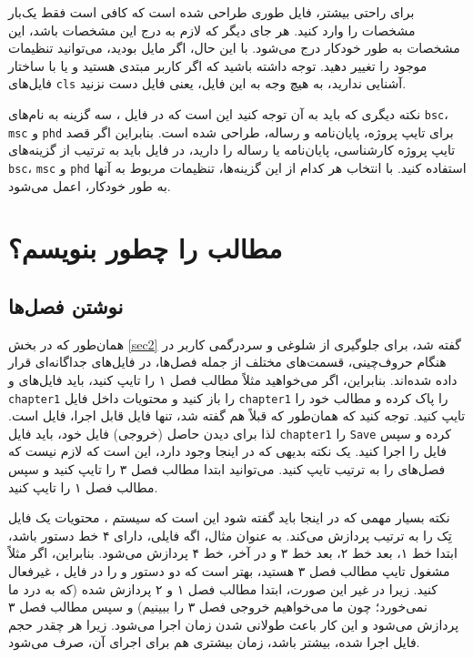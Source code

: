 برای راحتی بیشتر، 
فایل 
طوری طراحی شده است که کافی است فقط  یک‌بار مشخصات \پ  را وارد کنید. هر جای دیگر که لازم به درج این مشخصات باشد، این مشخصات به طور خودکار درج می‌شود. با این حال، اگر مایل بودید، می‌توانید تنظیمات موجود را تغییر دهید. توجه داشته باشید که اگر کاربر مبتدی هستید و یا با ساختار فایل‌های  
\verb!cls!
 آشنایی ندارید، به هیچ وجه به این فایل، یعنی فایل 
دست نزنید.

نکته دیگری که باید به آن توجه کنید این است که در فایل 
،
سه گزینه به نام‌های
\verb!bsc!،
\verb!msc!
و
\verb!phd!
برای تایپ پروژه، پایان‌نامه و رساله،
طراحی شده است. بنابراین اگر قصد تایپ پروژه کارشناسی، پایان‌نامه یا رساله را دارید، 
 در فایل 
باید به ترتیب از گزینه‌های
\verb!bsc!،
\verb!msc!
و
\verb!phd!
استفاده کنید. با انتخاب هر کدام از این گزینه‌ها، تنظیمات مربوط به آنها به طور خودکار، اعمل می‌شود.    
\section{مطالب \پ را چطور بنویسم؟}
\subsection{نوشتن فصل‌ها}
همان‌طور که در بخش \ref{sec2} گفته شد، برای جلوگیری از شلوغی و سردرگمی کاربر در هنگام حروف‌چینی، قسمت‌های مختلف \پ از جمله فصل‌ها، در فایل‌های جداگانه‌ای قرار داده شده‌اند. 
بنابراین، اگر می‌خواهید مثلاً مطالب فصل ۱ را تایپ کنید، باید فایل‌های 
و
\verb!chapter1!
را باز کنید و محتویات داخل فایل 
\verb!chapter1!
را پاک کرده و مطالب خود را تایپ کنید. توجه کنید که همان‌طور که قبلاً هم گفته شد، تنها فایل قابل اجرا، فایل 
است. لذا برای دیدن حاصل (خروجی) فایل خود، باید فایل  
\verb!chapter1!
را 
\verb!Save!
کرده و سپس فایل 
را اجرا کنید. یک نکته بدیهی که در اینجا وجود دارد، این است که لازم نیست که فصل‌های \پ را به ترتیب تایپ کنید. می‌توانید ابتدا مطالب فصل ۳ را تایپ کنید و سپس مطالب فصل ۱ را تایپ کنید. 

نکته بسیار مهمی که در اینجا باید گفته شود این است که سیستم \lr{\TeX}، محتویات یک فایل تِک را به ترتیب پردازش می‌کند. به عنوان مثال، اگه فایلی، دارای ۴ خط دستور باشد، ابتدا خط ۱، بعد خط ۲، بعد خط ۳ و در آخر، خط ۴ پردازش می‌شود. بنابراین، اگر مثلاً مشغول تایپ مطالب فصل ۳ هستید، بهتر است
که دو دستور 
\verb!!
و
\verb!!
را در فایل 
،
غیرفعال%
 کنید. زیرا در غیر این صورت، ابتدا مطالب فصل ۱ و ۲ پردازش شده (که به درد ما نمی‌خورد؛ چون ما می‌خواهیم خروجی فصل ۳ را ببینیم) و سپس مطالب فصل ۳ پردازش می‌شود و این کار باعث طولانی شدن زمان اجرا می‌شود. زیرا هر چقدر حجم فایل اجرا شده، بیشتر باشد، زمان بیشتری هم برای اجرای آن، صرف می‌شود.
